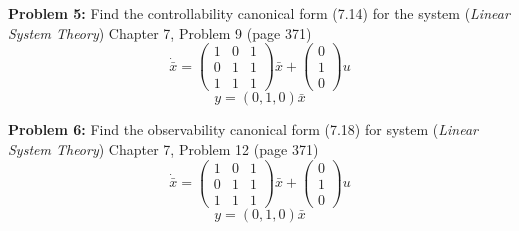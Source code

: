 \documentclass[12pt]{article}
\begin{document}
\noindent
\textbf{Problem 5:} Find the controllability canonical form (7.14) for the system ({\em Linear System Theory}) Chapter 7, Problem 9 (page 371)
$$\dot{\bar{x}}=\begin{pmatrix}
	1 & 0 & 1 \\
	0 & 1 & 1 \\
	1 & 1 & 1
\end{pmatrix} \bar{x}
+
\begin{pmatrix}
	0\\
	1\\
	0
\end{pmatrix}u$$
$$y=(0,1,0)\bar{x}$$

\noindent
\textbf{Problem 6:} Find the observability canonical form (7.18) for system ({\em Linear System Theory}) Chapter 7, Problem 12 (page 371)
$$\dot{\bar{x}}=\begin{pmatrix}
	1 & 0 & 1 \\
	0 & 1 & 1 \\
	1 & 1 & 1
\end{pmatrix} \bar{x}
+
\begin{pmatrix}
	0\\
	1\\
	0
\end{pmatrix}u$$
$$y=(0,1,0)\bar{x}$$
\end{document}
